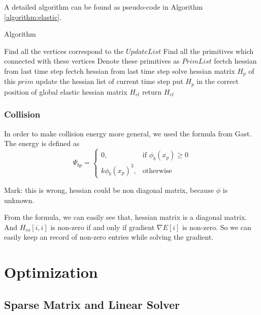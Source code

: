 \documentclass[
	11pt, 
	a4paper, 
	oneside,  
	final, 
]{report}
\begin{document}
A detailed algorithm can be found as pseudo-code in Algorithm \ref{algorithm:elastic}.

\begin{algorithm}
	\caption{Algorithm}
	\label{algorithm:elastic}
	\begin{algorithmic}[1]
		\State Find all the vertices correspond to the $UpdateList$
		\State Find all the primitives which connected with these vertices
		\State Denote these primitives as $PrimList$
		\State fectch hessian from last time step
		\Else
		\State fectch hessian from last time step
		\Else
		\State solve hessian matrix $H_{p}$ of this $prim$
		\EndIf
		\EndIf
		\State update the hessian list of current time step
		\State put $H_{p}$ in the correct position of global elastic hessian matrix $H_{el}$
		\EndFor
		\State return $H_{el}$
		\EndProcedure
		
	\end{algorithmic}
\end{algorithm}

\subsection{Collision}



In order to make collision energy more general, we used the formula from Gast. The energy is defined as
$$
	\Psi_{bp} = 
	\begin{cases}
		0,               & \text{if } \phi_b(x_p) \geq 0 \\
		k\phi_b(x_p)^3 , & \text{otherwise}
	\end{cases}
$$

Mark: this is wrong, hessian could be non diagonal matrix, because $\phi$ is unknown. 

From the formula, we can easily see that, hessian matrix is a diagonal matrix. And $H_{co}[i,i]$ is non-zero if and only if gradient $\nabla E [i]$ is non-zero. So we can easily keep an record of non-zero entries while solving the gradient. 




\chapter{Optimization}
\section{Sparse Matrix and Linear Solver}
\end{document}
